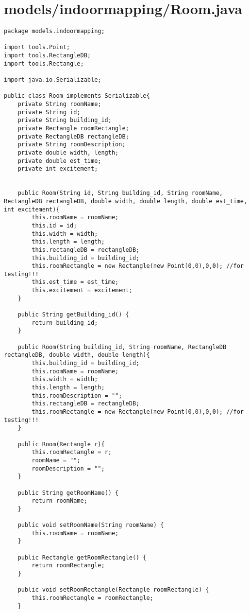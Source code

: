 \documentclass{article}
\begin{document}
\section{models/indoormapping/Room.java}
\begin{lstlisting}package models.indoormapping;

import tools.Point;
import tools.RectangleDB;
import tools.Rectangle;

import java.io.Serializable;

public class Room implements Serializable{
    private String roomName;
    private String id;
    private String building_id;
    private Rectangle roomRectangle;
    private RectangleDB rectangleDB;
    private String roomDescription;
    private double width, length;
    private double est_time;
    private int excitement;


    public Room(String id, String building_id, String roomName, RectangleDB rectangleDB, double width, double length, double est_time, int excitement){
        this.roomName = roomName;
        this.id = id;
        this.width = width;
        this.length = length;
        this.rectangleDB = rectangleDB;
        this.building_id = building_id;
        this.roomRectangle = new Rectangle(new Point(0,0),0,0); //for testing!!!
        this.est_time = est_time;
        this.excitement = excitement;
    }

    public String getBuilding_id() {
        return building_id;
    }

    public Room(String building_id, String roomName, RectangleDB rectangleDB, double width, double length){
        this.building_id = building_id;
        this.roomName = roomName;
        this.width = width;
        this.length = length;
        this.roomDescription = "";
        this.rectangleDB = rectangleDB;
        this.roomRectangle = new Rectangle(new Point(0,0),0,0); //for testing!!!
    }

    public Room(Rectangle r){
        this.roomRectangle = r;
        roomName = "";
        roomDescription = "";
    }

    public String getRoomName() {
        return roomName;
    }

    public void setRoomName(String roomName) {
        this.roomName = roomName;
    }

    public Rectangle getRoomRectangle() {
        return roomRectangle;
    }

    public void setRoomRectangle(Rectangle roomRectangle) {
        this.roomRectangle = roomRectangle;
    }


\end{lstlisting}
\end{document}
